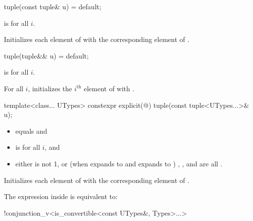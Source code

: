 %
\begin{itemdecl}
tuple(const tuple& u) = default;
\end{itemdecl}

\begin{itemdescr}
\pnum
\mandates
{} is  for all $i$.

\pnum
\effects
Initializes each element of  with the
corresponding element of .
\end{itemdescr}

%
\begin{itemdecl}
tuple(tuple&& u) = default;
\end{itemdecl}

\begin{itemdescr}
\pnum
\constraints
{} is  for all $i$.

\pnum
\effects
For all $i$, initializes the $i^\text{th}$ element of  with
.
\end{itemdescr}

%
\begin{itemdecl}
template<class... UTypes> constexpr explicit(@\seebelow@) tuple(const tuple<UTypes...>& u);
\end{itemdecl}

\begin{itemdescr}
\pnum
\constraints
\begin{itemize}
\item
{} equals  and

\item
{} is  for all $i$, and

\item
either
 is not 1, or
(when  expands to  and  expands to )
, , and  are all .
\end{itemize}

\pnum
\effects
Initializes each element of 
with the corresponding element of .

\pnum
\remarks
The expression inside  is equivalent to:
\begin{codeblock}
!conjunction_v<is_convertible<const UTypes&, Types>...>
\end{codeblock}
\end{itemdescr}

